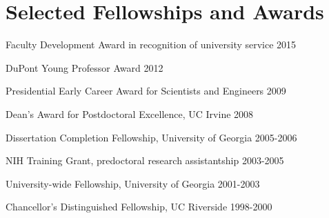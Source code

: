 \documentclass[letterpaper]{article}
\renewenvironment{itemize}{
  \begin{list}{}{
    \setlength{\leftmargin}{1.5em}
  }
}{
  \end{list}
}
\begin{document}
\section*{Selected Fellowships and Awards}
\begin {itemize}

\item Faculty Development Award in recognition of university service 2015
\item DuPont Young Professor Award 2012 
\item Presidential Early Career Award for Scientists and Engineers 2009
\item Dean's Award for Postdoctoral Excellence, UC Irvine 2008
\item Dissertation Completion Fellowship, University of Georgia 2005-2006
\item NIH Training Grant, predoctoral research assistantship 2003-2005
\item University-wide Fellowship, University of Georgia 2001-2003
\item Chancellor's Distinguished Fellowship, UC Riverside 1998-2000
\end{itemize}

\end{document}
